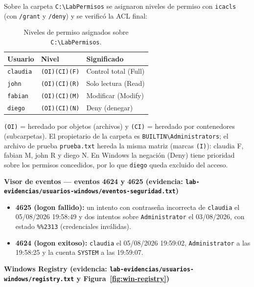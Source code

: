 \documentclass[11pt,a4paper]{report}
\begin{document}
Sobre la carpeta \texttt{C:\textbackslash{}LabPermisos} se asignaron niveles de permiso con \texttt{icacls} (con \texttt{/grant} y \texttt{/deny}) y se verificó la ACL final:

\begin{table}[H]
  \centering
  \begin{tabular}{@{}lll@{}}
    \toprule
    \textbf{Usuario} & \textbf{Nivel} & \textbf{Significado} \\
    \midrule
    \texttt{claudia} & \texttt{(OI)(CI)(F)} & Control total (Full) \\
    \texttt{john}    & \texttt{(OI)(CI)(R)} & Solo lectura (Read) \\
    \texttt{fabian}  & \texttt{(OI)(CI)(M)} & Modificar (Modify) \\
    \texttt{diego}   & \texttt{(OI)(CI)(N)} & Deny (denegar) \\
    \bottomrule
  \end{tabular}
  \caption{Niveles de permiso asignados sobre \texttt{C:\textbackslash{}LabPermisos}.}
  \label{tab:win-acl}
\end{table}

\texttt{(OI)} = heredado por objetos (archivos) y \texttt{(CI)} = heredado por contenedores (subcarpetas). El propietario de la carpeta es \texttt{BUILTIN\textbackslash{}Administrators}; el archivo de prueba \texttt{prueba.txt} hereda la misma matriz (marcas \texttt{(I)}): claudia F, fabian M, john R y diego N. En Windows la negación (Deny) tiene prioridad sobre los permisos concedidos, por lo que \texttt{diego} queda excluido del acceso.

\textbf{Visor de eventos --- eventos 4624 y 4625 (evidencia: \texttt{lab-evidencias/usuarios-windows/\allowbreak eventos-seguridad.txt})}

\begin{itemize}
  \item \textbf{4625 (logon fallido):} un intento con contraseña incorrecta de \texttt{claudia} el 05/08/2026 19:58:49 y dos intentos sobre \texttt{Administrator} el 03/08/2026, con estado \texttt{\%\%2313} (credenciales inválidas).
  \item \textbf{4624 (logon exitoso):} \texttt{claudia} el 05/08/2026 19:59:02, \texttt{Administrator} a las 19:58:25 y la cuenta \texttt{SYSTEM} a las 19:59:07.
\end{itemize}

\textbf{Windows Registry (evidencia: \texttt{lab-evidencias/usuarios-windows/registry.txt} y Figura~\ref{fig:win-registry})}
\end{document}
